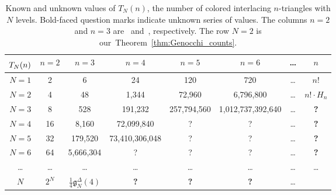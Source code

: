 \documentclass[10pt,a4paper]{amsart}
\numberwithin{equation}{section}
\theoremstyle{definition}
\begin{document}
\begin{table}[!ht]
	\centering \small
	\begin{tabular}{|c|c|c|c|c|c|c|c|}
\hline $T_N(n)\rule{0pt}{13pt}$ & $n=2$                 & $n=3$                                & $n=4$          & $n=5$       & $n=6$             & \dots & $n$           \\[2pt]
\hline $N=1$                    & 2                     & 6                                    & 24             & 120         & 720               & \dots & $n!$          \\ \hline $N=2$                    & 4                     & 48                                   & 1,344          & 72,960      & 6,796,800         & \dots &$n!\cdot H_n$ \\ \hline $N=3$                    & 8                     & 528                                  &191,232        & 257,794,560 & 1,012,737,392,640 & \dots &\textbf{?}             \\ \hline $N=4$                    & 16                    & 8,160                                & 72,099,840     & ?           & ?                 & \dots & \textbf{?}		\\ \hline $N=5$                    & 32                    & 179,520                              & 73,410,306,048 & ?           & ?                 & \dots & \textbf{?}             \\ \hline
		$N=6$            & 64                    & 5,666,304                            & ?              & ?           &?                 & \dots & \textbf{?}             \\ \hline \dots                   & \dots                & \dots                               & \dots         & \dots      & \dots            & \dots & \dots		\\ \hline $N$                      & $2^N$\rule{0pt}{12pt} &$\tfrac14\mathfrak{g}_N^{\Delta}(4)$ & \textbf{?}     &\textbf{?}  & \textbf{?}        & \dots &		\\[3pt] \hline
	\end{tabular}
	\caption{Known and unknown values of $T_N(n)$, the number of colored
	interlacing $n$-triangles with $N$ levels.
	Bold-faced question marks indicate unknown series of values.
	The columns $n=2$ and $n=3$ are~\cite{ABW2023coloured_LLT} and~\cite{gaetz2023bijection}, respectively.
	The row $N=2$ is our~Theorem~\ref{thm:Genocchi_counts}.}
	\label{tab:known_counts_of_colored_interlacing_triangles}
\end{table}
\end{document}
